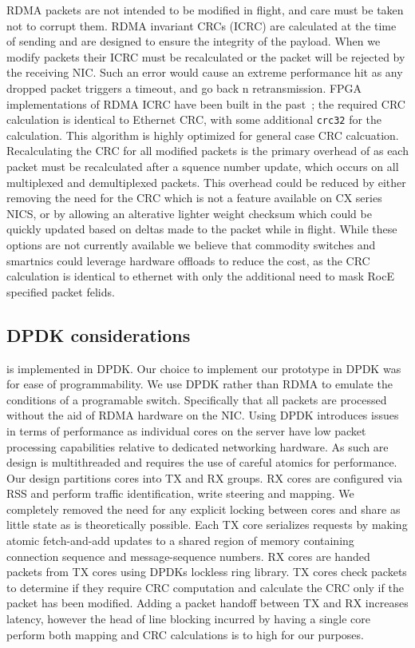 RDMA packets are not intended to be modified in flight, and care must be taken
not to corrupt them. RDMA invariant CRCs (ICRC) are calculated at the time of
sending and are designed to ensure the integrity of the payload. When we modify
packets their ICRC must be recalculated or the packet will be rejected by the
receiving NIC. Such an error would cause an extreme performance hit as any
dropped packet triggers a timeout, and go back n retransmission.  FPGA
implementations of RDMA ICRC have been built in the past~\cite{Mansour_2019};
the required CRC calculation is identical to Ethernet CRC, with some additional
\texttt{crc32} for the calculation. This algorithm is highly optimized for
general case CRC calcuation. Recalculating the CRC for all modified packets is
the primary overhead of \sword as each packet must be recalculated after a
squence number update, which occurs on all multiplexed and demultiplexed
packets. This overhead could be reduced by either removing the need for the CRC
which is not a feature available on CX series NICS, or by allowing an alterative
lighter weight checksum which could be quickly updated based on deltas made to
the packet while in flight. While these options are not currently available we
believe that commodity switches and smartnics could leverage hardware offloads
to reduce the cost, as the CRC calculation is identical to ethernet with only the
additional need to mask RocE specified packet felids.

\subsection{DPDK considerations}

\sword is implemented in DPDK. Our choice to implement our prototype in DPDK was
for ease of programmability. We use DPDK rather than RDMA to emulate the
conditions of a programable switch. Specifically that all packets are processed
without the aid of RDMA hardware on the NIC. Using DPDK introduces issues in
terms of performance as individual cores on the server have low packet
processing capabilities relative to dedicated networking hardware. As such are
design is multithreaded and requires the use of careful atomics for performance.
Our design partitions cores into TX and RX groups. RX cores are configured via
RSS and perform traffic identification, write steering and mapping. We
completely removed the need for any explicit locking between cores and share as
little state as is theoretically possible. Each TX core serializes requests by
making atomic fetch-and-add updates to a shared region of memory containing
connection sequence and message-sequence numbers. RX cores are handed packets
from TX cores using DPDKs lockless ring library. TX cores check packets to
determine if they require CRC computation and calculate the CRC only if the
packet has been modified. Adding a packet handoff between TX and RX increases
latency, however the head of line blocking incurred by having a single core
perform both mapping and CRC calculations is to high for our purposes.
